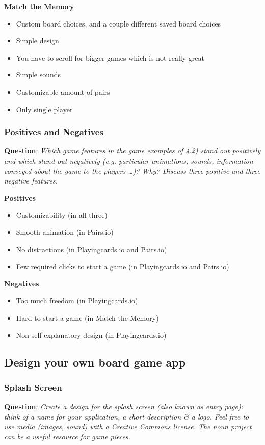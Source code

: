\documentclass{article}
\begin{document}
\href{https://matchthememory.com/}{\textbf{Match the Memory}}
\begin{itemize}
    \item Custom board choices, and a couple different saved board choices
    \item Simple design
    \item You have to scroll for bigger games which is not really great
    \item Simple sounds
    \item Customizable amount of pairs
    \item Only single player
\end{itemize}

\subsubsection{Positives and Negatives}
\textbf{Question}: \textit{Which game features in the game examples of 4.2) stand out positively and which stand out negatively (e.g. particular animations, sounds, information conveyed about the game to the players …)? Why? Discuss three positive and three negative features.}

\textbf{Positives}
\begin{itemize}
    \item Customizability (in all three)
    \item Smooth animation (in Pairs.io)
    \item No distractions (in Playingcards.io and Pairs.io)
    \item Few required clicks to start a game (in Playingcards.io and Pairs.io)
\end{itemize}

\textbf{Negatives}
\begin{itemize}
    \item Too much freedom (in Playingcards.io)
    \item Hard to start a game (in Match the Memory)
    \item Non-self explanatory design (in Playingcards.io)
\end{itemize}

\subsection{Design your own board game app}

\subsubsection{Splash Screen}
\textbf{Question}: \textit{Create a design for the splash screen (also known as entry page): think of a name for your application, a short description & a logo. Feel free to use media (images, sound) with a Creative Commons license. The noun project can be a useful resource for game pieces.}
\end{document}
